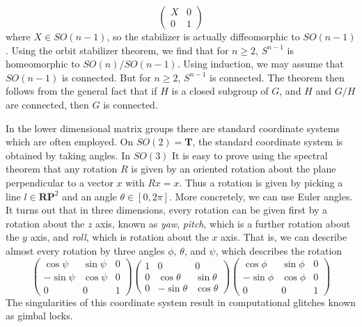 \begin{example}
    \[ \begin{pmatrix} X & 0 \\ 0 & 1 \end{pmatrix} \]
    where $X \in SO(n-1)$, so the stabilizer is actually diffeomorphic to $SO(n-1)$. Using the orbit stabilizer theorem, we find that for $n \geq 2$, $S^{n-1}$ is homeomorphic to $SO(n)/SO(n-1)$. Using induction, we may assume that $SO(n-1)$ is connected. But for $n \geq 2$, $S^{n-1}$ is connected. The theorem then follows from the general fact that if $H$ is a closed subgroup of $G$, and $H$ and $G/H$ are connected, then $G$ is connected.
\end{example}

\begin{remark}
    In the lower dimensional matrix groups there are standard coordinate systems which are often employed. On $SO(2) = \mathbf{T}$, the standard coordinate system is obtained by taking angles. In $SO(3)$ It is easy to prove using the spectral theorem that any rotation $R$ is given by an oriented rotation about the plane perpendicular to a vector $x$ with $Rx = x$. Thus a rotation is given by picking a line $l \in \mathbf{RP}^2$ and an angle $\theta \in [0,2\pi]$. More concretely, we can use Euler angles. It turns out that in three dimensions, every rotation can be given first by a rotation about the $z$ axis, known as {\it yaw}, {\it pitch}, which is a further rotation about the $y$ axis, and {\it roll}, which is rotation about the $x$ axis. That is, we can describe almost every rotation by three angles $\phi$, $\theta$, and $\psi$, which describes the rotation
    \[ \begin{pmatrix} \cos \psi & \sin \psi & 0 \\ - \sin \psi & \cos \psi & 0 \\ 0 & 0 & 1 \end{pmatrix} \begin{pmatrix} 1 & 0 & 0 \\ 0 & \cos \theta & \sin \theta \\ 0 & - \sin \theta & \cos \theta \end{pmatrix} \begin{pmatrix} \cos \phi & \sin \phi & 0 \\ -\sin \phi & \cos \phi & 0 \\ 0 & 0 & 1 \end{pmatrix} \]
    The singularities of this coordinate system result in computational glitches known as gimbal locks.
\end{remark}

